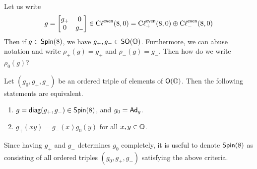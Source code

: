 \begin{remark*}
    Let us write
    \[g =\begin{bmatrix}g_+&0\\0&g_-\end{bmatrix}\in\operatorname{C\ell}^{\textsf{even}}(8,0) = \operatorname{C\ell}_+^{\textsf{even}}(8,0)\oplus \operatorname{C\ell}_-^{\textsf{even}}(8,0)\]
    Then if $g\in \operatorname{\textsf{Spin}}(8)$, we have $g_+,g_-\in\operatorname{\textsf{SO}}(\operatorname{\mathbb{O}})$. Furthermore, we can abuse notation and write $\rho_+(g)=g_+$ and $\rho_-(g)=g_-$. Then how do we write $\rho_0(g)$?
\end{remark*}
\begin{thm}
Let $(g_0, g_+, g_-)$ be an ordered triple of elements of $\operatorname{\textsf{O}}(\operatorname{\mathbb{O}})$. Then the following statements are equivalent.
\begin{enumerate}
    \item $g=
\operatorname{\textsf{diag}}(g_+, g_-)\in \operatorname{\textsf{Spin}}(8)$, and $g_0 = \operatorname{\textsf{Ad}}_g$.
\item $g_+(xy) = g_-(x)g_0(y)$ for all $x,y \in \operatorname{\mathbb{O}}$.
\end{enumerate}
\end{thm}
\begin{remark*}
    Since having $g_+$ and $g_-$ determines $g_0$ completely, it is useful to denote $\operatorname{\textsf{Spin}}(8)$ as consisting of all ordered triples $(g_0,g_+,g_-)$ satisfying the above criteria. 
\end{remark*}
